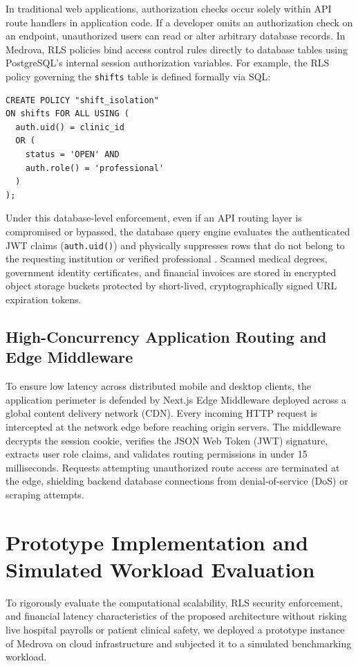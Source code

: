 \documentclass[conference]{IEEEtran}
\begin{document}
In traditional web applications, authorization checks occur solely within API route handlers in application code. If a developer omits an authorization check on an endpoint, unauthorized users can read or alter arbitrary database records. In Medrova, RLS policies bind access control rules directly to database tables using PostgreSQL's internal session authorization variables. For example, the RLS policy governing the \texttt{shifts} table is defined formally via SQL:

\begin{verbatim}
CREATE POLICY "shift_isolation" 
ON shifts FOR ALL USING (
  auth.uid() = clinic_id 
  OR (
    status = 'OPEN' AND 
    auth.role() = 'professional'
  )
);
\end{verbatim}

Under this database-level enforcement, even if an API routing layer is compromised or bypassed, the database query engine evaluates the authenticated JWT claims (\texttt{auth.uid()}) and physically suppresses rows that do not belong to the requesting institution or verified professional \cite{supabase2023rls}. Scanned medical degrees, government identity certificates, and financial invoices are stored in encrypted object storage buckets protected by short-lived, cryptographically signed URL expiration tokens.

\subsection{High-Concurrency Application Routing and Edge Middleware}
To ensure low latency across distributed mobile and desktop clients, the application perimeter is defended by Next.js Edge Middleware deployed across a global content delivery network (CDN). Every incoming HTTP request is intercepted at the network edge before reaching origin servers. The middleware decrypts the session cookie, verifies the JSON Web Token (JWT) signature, extracts user role claims, and validates routing permissions in under 15 milliseconds. Requests attempting unauthorized route access are terminated at the edge, shielding backend database connections from denial-of-service (DoS) or scraping attempts.

\section{Prototype Implementation and Simulated Workload Evaluation}
To rigorously evaluate the computational scalability, RLS security enforcement, and financial latency characteristics of the proposed architecture without risking live hospital payrolls or patient clinical safety, we deployed a prototype instance of Medrova on cloud infrastructure and subjected it to a simulated benchmarking workload.
\end{document}
